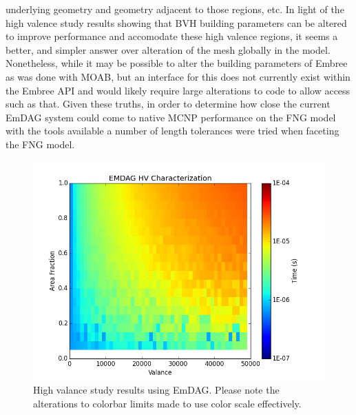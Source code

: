 \documentclass[12pt, a4paper]{article}
\begin{document}
underlying geometry and geometry adjacent to those regions, etc. In light of the high valence study results showing that BVH building parameters can be altered to improve performance and accomodate these high valence regions, it seems a better, and simpler answer over alteration of the mesh globally in the model. Nonetheless, while it may be possible to alter the building parameters of Embree as was done with MOAB, but an interface for this does not currently exist within the Embree API and would likely require large alterations to code to allow access such as that. Given these truths, in order to determine how close the current EmDAG system could come to native MCNP performance on the FNG model with the tools available a number of length tolerances were tried when faceting the FNG model.  

\begin{figure}[H]
  \begin{center}
    \includegraphics[scale=0.35]{hv_emdag.png}
    \caption{High valance study results using EmDAG. Please note the alterations to colorbar limits made to use color scale effectively.}
    \label{emdaghvstudy}
  \end{center}
\end{figure}
\end{document}

